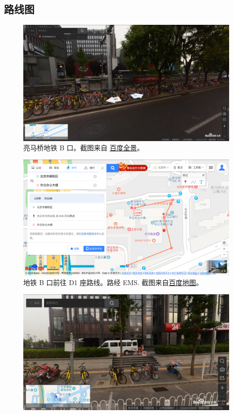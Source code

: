\documentclass[final]{book}
\begin{document}
\begin{appendices}
\section{路线图}
\begin{figure}[htbp]
  \centering
  \includegraphics[width=\linewidth]{metro-B}
  \caption[亮马桥地铁 B 口]{亮马桥地铁 B 口。截图来自 \href{https://map.baidu.com/\#panoid=09002200121707010630058282I\&panotype=street\&heading=0.64\&pitch=-4.92\&l=19\&tn=B_NORMAL_MAP\&sc=0\&newmap=1\&shareurl=1\&pid=09002200121707010630058282I}{百度全景}。}
  \label{fig:real}
\end{figure}
\begin{figure}
  \centering
  \includegraphics[width=\linewidth]{route-to-D1}
  \caption[地铁 B 口前往 D1 座路线]{地铁 B 口前往 D1 座路线。路经 EMS. 截图来自\href{https://map.baidu.com/}{百度地图}。}
  \label{fig:route}
\end{figure}
\begin{figure}
  \centering
  \includegraphics[width=\linewidth]{EMS}

\end{figure}
\end{appendices}
\end{document}
